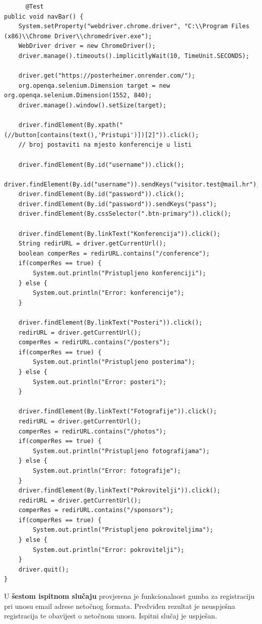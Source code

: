 	\begin{lstlisting}
	  @Test
public void navBar() {
	System.setProperty("webdriver.chrome.driver", "C:\\Program Files (x86)\\Chrome Driver\\chromedriver.exe");
	WebDriver driver = new ChromeDriver();
	driver.manage().timeouts().implicitlyWait(10, TimeUnit.SECONDS);	
	
	driver.get("https://posterheimer.onrender.com/");
	org.openqa.selenium.Dimension target = new  org.openqa.selenium.Dimension(1552, 840);
	driver.manage().window().setSize(target);
	
	driver.findElement(By.xpath("(//button[contains(text(),'Pristupi')])[2]")).click();
	// broj postaviti na mjesto konferencije u listi
	
	driver.findElement(By.id("username")).click();
	driver.findElement(By.id("username")).sendKeys("visitor.test@mail.hr");
	driver.findElement(By.id("password")).click();
	driver.findElement(By.id("password")).sendKeys("pass");
	driver.findElement(By.cssSelector(".btn-primary")).click();
	
	driver.findElement(By.linkText("Konferencija")).click();
	String redirURL = driver.getCurrentUrl();
	boolean comperRes = redirURL.contains("/conference");
	if(comperRes == true) {
		System.out.println("Pristupljeno konferenciji");
	} else {
		System.out.println("Error: konferencije");
	}
	
	driver.findElement(By.linkText("Posteri")).click();
	redirURL = driver.getCurrentUrl();
	comperRes = redirURL.contains("/posters");
	if(comperRes == true) {
		System.out.println("Pristupljeno posterima");
	} else {
		System.out.println("Error: posteri");
	}
	
	driver.findElement(By.linkText("Fotografije")).click();
	redirURL = driver.getCurrentUrl();
	comperRes = redirURL.contains("/photos");
	if(comperRes == true) {
		System.out.println("Pristupljeno fotografijama");
	} else {
		System.out.println("Error: fotografije");
	}
	driver.findElement(By.linkText("Pokrovitelji")).click();
	redirURL = driver.getCurrentUrl();
	comperRes = redirURL.contains("/sponsors");
	if(comperRes == true) {
		System.out.println("Pristupljeno pokroviteljima");
	} else {
		System.out.println("Error: pokrovitelji");
	}
	driver.quit();
}
	\end{lstlisting}
	
	U \textbf{šestom ispitnom slučaju} provjerena je funkcionalnost gumba za registraciju pri unosu email adrese netočnog formata. Predviđen rezultat je neuspješna registracija te obavijest o netočnom unosu. Ispitni slučaj je uspješan. 

